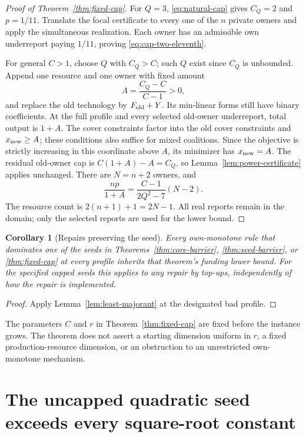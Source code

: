 \documentclass[11pt]{article}
\newtheorem{corollary}[theorem]{Corollary}
\theoremstyle{definition}
\theoremstyle{remark}
\begin{document}
\begin{proof}[Proof of Theorem~\ref{thm:fixed-cap}]
For $Q=3$, \eqref{eq:natural-cap} gives $C_Q=2$ and $p=1/11$.
Translate the focal certificate to every one of the $n$ private owners
and apply the simultaneous realization.  Each owner has an admissible
own underreport paying $1/11$, proving \eqref{eq:cap-two-eleventh}.

For general $C>1$, choose $Q$ with $C_Q>C$; such $Q$ exist since
$C_Q$ is unbounded.  Append one resource and one owner with fixed amount
\[
 A=\frac{C_Q-C}{C-1}>0,
\]
and replace the old technology by $F_{\rm old}+Y$.  Its min-linear forms
still have binary coefficients.  At the full profile and every selected
old-owner underreport, total output is $1+A$.  The cover constraints
factor into the old cover constraints and $x_{\rm new}\ge A$; these
conditions also suffice for mixed coalitions.  Since the objective is
strictly increasing in this coordinate above $A$, its minimizer has
$x_{\rm new}=A$.  The residual old-owner cap is
$C(1+A)-A=C_Q$, so Lemma~\ref{lem:power-certificate} applies unchanged.
There are $N=n+2$ owners, and
\[
 \frac{np}{1+A}
 =\frac{C-1}{2Q^2-7}(N-2).
\]
The resource count is $2(n+1)+1=2N-1$.  All real reports remain in the
domain; only the selected reports are used for the lower bound.
\end{proof}

\begin{corollary}[Repairs preserving the seed]
\label{cor:majorant-barrier}
Every own-monotone rule that dominates one of the seeds in
Theorems~\ref{thm:core-barrier}, \ref{thm:seed-barrier}, or
\ref{thm:fixed-cap} at every profile inherits that theorem's funding lower
bound.  For the specified capped seeds this applies to any repair by
top-ups, independently of how the repair is implemented.
\end{corollary}
\begin{proof}
Apply Lemma~\ref{lem:least-majorant} at the designated bad profile.
\end{proof}

The parameters $C$ and $r$ in Theorem~\ref{thm:fixed-cap} are fixed before
the instance grows.  The theorem does not assert a starting dimension
uniform in $r$, a fixed production-resource dimension, or an obstruction
to an unrestricted own-monotone mechanism.

\section{The uncapped quadratic seed exceeds every square-root constant}
\label{sec:uncapped}
\end{document}
